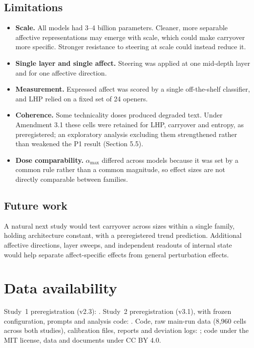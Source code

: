 \documentclass[11pt]{article}
\newcommand{\amax}{\alpha_{\max}}
\begin{document}
\subsection{Limitations}

\begin{itemize}
\item \textbf{Scale.} All models had 3--4 billion parameters. Cleaner, more separable affective representations may emerge with scale, which could make carryover more specific. Stronger resistance to steering at scale could instead reduce it.
\item \textbf{Single layer and single affect.} Steering was applied at one mid-depth layer and for one affective direction.
\item \textbf{Measurement.} Expressed affect was scored by a single off-the-shelf classifier, and LHP relied on a fixed set of 24 openers.
\item \textbf{Coherence.} Some technicality doses produced degraded text. Under Amendment 3.1 these cells were retained for LHP, carryover and entropy, as preregistered; an exploratory analysis excluding them strengthened rather than weakened the P1 result (Section 5.5).
\item \textbf{Dose comparability.} $\amax$ differed across models because it was set by a common rule rather than a common magnitude, so effect sizes are not directly comparable between families.
\end{itemize}

\subsection{Future work}

A natural next study would test carryover across sizes within a single family, holding architecture constant, with a preregistered trend prediction. Additional affective directions, layer sweeps, and independent readouts of internal state would help separate affect-specific effects from general perturbation effects.

\section*{Data availability}

Study~1 preregistration (v2.3): . Study~2 preregistration (v3.1), with frozen configuration, prompts and analysis code: . Code, raw main-run data (8{,}960 cells across both studies), calibration files, reports and deviation logs:  \citep{su2026data}; code under the MIT license, data and documents under CC BY 4.0.
\end{document}
